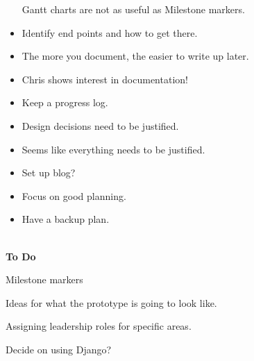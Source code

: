 \begin{itemize}
  Gantt charts are not as useful as Milestone markers.
\item
  Identify end points and how to get there.
\item
  The more you document, the easier to write up later.
\item
  Chris shows interest in documentation!
\item
  Keep a progress log.
\item
  Design decisions need to be justified.
\item
  Seems like everything needs to be justified.
\item
  Set up blog?
\item
  Focus on good planning.
\item
  Have a backup plan.
\end{itemize}
\\
\textbf{To Do}

Milestone markers

Ideas for what the prototype is going to look like.

Assigning leadership roles for specific areas.

Decide on using Django?

